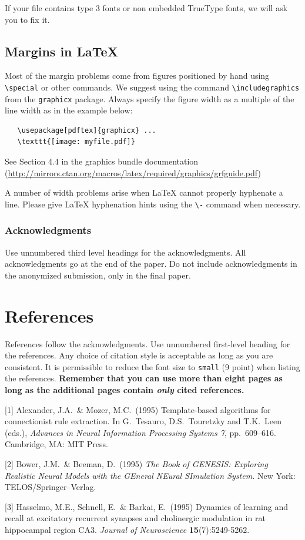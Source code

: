 \documentclass{article}
\begin{document}
If your file contains type 3 fonts or non embedded TrueType fonts, we
will ask you to fix it.

\subsection{Margins in \LaTeX{}}

Most of the margin problems come from figures positioned by hand using
\verb+\special+ or other commands. We suggest using the command
\verb+\includegraphics+ from the \verb+graphicx+ package. Always
specify the figure width as a multiple of the line width as in the
example below:
\begin{verbatim}
   \usepackage[pdftex]{graphicx} ...
   \texttt{[image: myfile.pdf]}
\end{verbatim}
See Section 4.4 in the graphics bundle documentation
(\url{http://mirrors.ctan.org/macros/latex/required/graphics/grfguide.pdf})

A number of width problems arise when \LaTeX{} cannot properly
hyphenate a line. Please give LaTeX hyphenation hints using the
\verb+\-+ command when necessary.

\subsubsection*{Acknowledgments}

Use unnumbered third level headings for the acknowledgments. All
acknowledgments go at the end of the paper. Do not include
acknowledgments in the anonymized submission, only in the final paper.

\section*{References}

References follow the acknowledgments. Use unnumbered first-level
heading for the references. Any choice of citation style is acceptable
as long as you are consistent. It is permissible to reduce the font
size to \verb+small+ (9 point) when listing the references. {\bf
  Remember that you can use more than eight pages as long as the
  additional pages contain \emph{only} cited references.}
\medskip

\small

[1] Alexander, J.A.\ \& Mozer, M.C.\ (1995) Template-based algorithms
for connectionist rule extraction. In G.\ Tesauro, D.S.\ Touretzky and
T.K.\ Leen (eds.), {\it Advances in Neural Information Processing
  Systems 7}, pp.\ 609--616. Cambridge, MA: MIT Press.

[2] Bower, J.M.\ \& Beeman, D.\ (1995) {\it The Book of GENESIS:
  Exploring Realistic Neural Models with the GEneral NEural SImulation
  System.}  New York: TELOS/Springer--Verlag.

[3] Hasselmo, M.E., Schnell, E.\ \& Barkai, E.\ (1995) Dynamics of
learning and recall at excitatory recurrent synapses and cholinergic
modulation in rat hippocampal region CA3. {\it Journal of
  Neuroscience} {\bf 15}(7):5249-5262.
\end{document}
